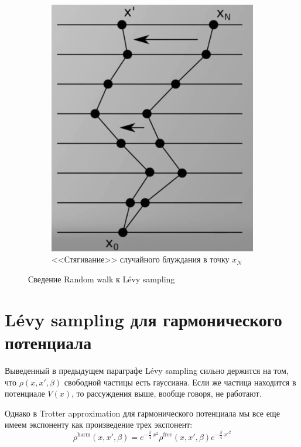 \begin{lecture}
\begin{figure}[ht]
\begin{subfigure}{0.5\columnwidth}
            \includegraphics[width=\linewidth]{fig/random-walk-pulling}
            \caption{<<Стягивание>> случайного блуждания в точку $x_N$}
            \label{fig:random-walk-pulling}
        \end{subfigure}
        \caption{Сведение Random walk к Lévy sampling}
    \end{figure}

    \section{Lévy sampling для гармонического потенциала}
    \label{sec:levy-harmonic}
    Выведенный в предыдущем параграфе Lévy sampling сильно держится на том, что $\rho (x, x', \beta)$ свободной частицы есть гауссиана.
    Если же частица находится в потенциале $V(x)$, то рассуждения выше, вообще говоря, не работают.

    Однако в Trotter approximation для гармонического потенциала мы все еще имеем экспоненту как произведение трех экспонент:
    \begin{equation}
        \label{eq:rho_harmonic-trotter}
        \rho^{\text{harm}} (x, x', \beta) = e^{-\frac{\beta}{4}\, x^2} \rho^{\text{free}} (x, x', \beta) e^{-\frac{\beta}{4}\, {x'}^2}
    \end{equation}


\end{lecture}
